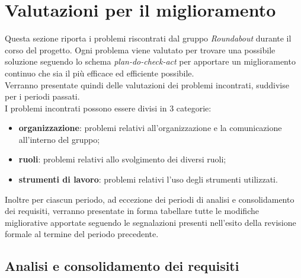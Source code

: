 \section{Valutazioni per il miglioramento}
	Questa sezione riporta i problemi riscontrati dal gruppo \textit{Roundabout} durante il corso del progetto. Ogni problema viene valutato per trovare una possibile soluzione seguendo lo schema \textit{plan-do-check-act} per apportare un miglioramento continuo che sia il più efficace ed efficiente possibile. \\
	Verranno presentate quindi delle valutazioni dei problemi incontrati, suddivise per i periodi passati. \\
		I problemi incontrati possono essere divisi in 3 categorie:
		\begin{itemize}
			\item \textbf{organizzazione}: problemi relativi all’organizzazione e la comunicazione all’interno del gruppo;
			\item \textbf{ruoli}: problemi relativi allo svolgimento dei diversi ruoli;
			\item \textbf{strumenti di lavoro}: problemi relativi l’uso degli strumenti utilizzati.
		\end{itemize}
	Inoltre per ciascun periodo, ad eccezione dei periodi di analisi e consolidamento dei requisiti, verranno presentate in forma tabellare tutte le modifiche migliorative apportate seguendo le segnalazioni presenti nell'esito della revisione formale al termine del periodo precedente.
	

	\subsection{Analisi e consolidamento dei requisiti}
	
